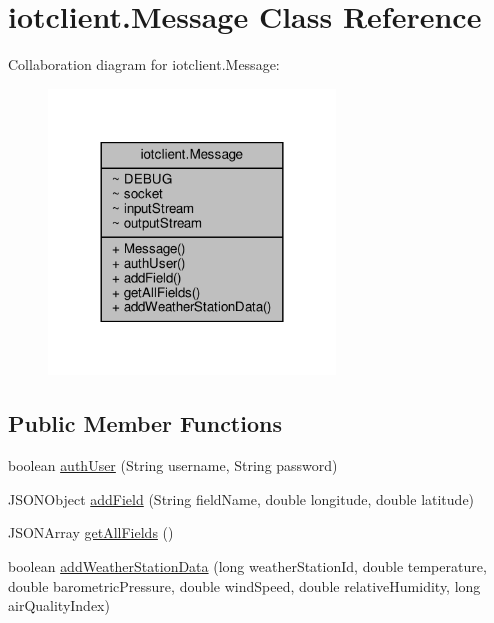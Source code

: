 \hypertarget{classiotclient_1_1Message}{}\section{iotclient.\+Message Class Reference}
\label{classiotclient_1_1Message}


Collaboration diagram for iotclient.\+Message\+:\nopagebreak
\begin{figure}[H]
\begin{center}
\leavevmode
\includegraphics[width=216pt]{classiotclient_1_1Message__coll__graph}
\end{center}
\end{figure}
\subsection*{Public Member Functions}
\begin{DoxyCompactItemize}
\item 
boolean \hyperlink{classiotclient_1_1Message_a4e2ba3e3d5156b8014443aab39e240fc}{auth\+User} (String username, String password)
\item 
J\+S\+O\+N\+Object \hyperlink{classiotclient_1_1Message_aabe363a067aa335d1b00f7587632da52}{add\+Field} (String field\+Name, double longitude, double latitude)
\item 
J\+S\+O\+N\+Array \hyperlink{classiotclient_1_1Message_a22814eaf8f1a8a3bb07b7823c52c83e8}{get\+All\+Fields} ()
\item 
boolean \hyperlink{classiotclient_1_1Message_aab1d4eea6ba3c4172d599aafc5898dfc}{add\+Weather\+Station\+Data} (long weather\+Station\+Id, double temperature, double barometric\+Pressure, double wind\+Speed, double relative\+Humidity, long air\+Quality\+Index)
\end{DoxyCompactItemize}


